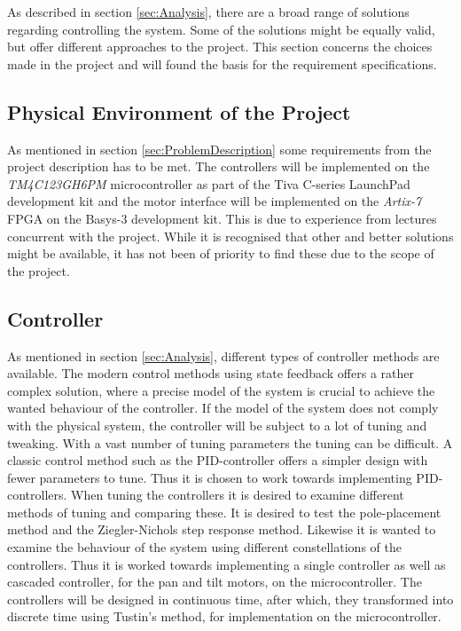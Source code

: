 \documentclass[../../main.tex]{subfiles}
\begin{document}
As described in section \ref{sec:Analysis}, there are a broad range of solutions regarding controlling the system. Some of the solutions might be equally valid, but offer different approaches to the project. This section concerns the choices made in the project and will found the basis for the requirement specifications.

\subsection*{Physical Environment of the Project}
As mentioned in section \ref{sec:ProblemDescription} some requirements from the project description has to be met. The controllers will be implemented on the \textit{TM4C123GH6PM} microcontroller as part of the Tiva C-series LaunchPad development kit and the motor interface will be implemented on the \textit{Artix-7} FPGA on the Basys-3 development kit. This is due to experience from lectures concurrent with the project. While it is recognised that other and better solutions might be available, it has not been of priority to find these due to the scope of the project. 



\subsection*{Controller}
As mentioned in section \ref{sec:Analysis}, different types of controller methods are available. The modern control methods using state feedback offers a rather complex solution, where a precise model of the system is crucial to achieve the wanted behaviour of the controller. If the model of the system does not comply with the physical system, the controller will be subject to a lot of tuning and tweaking. With a vast number of tuning parameters the tuning can be difficult. A classic control method such as the PID-controller offers a simpler design with fewer parameters to tune. Thus it is chosen to work towards implementing PID-controllers. When tuning the controllers it is desired to examine different methods of tuning and comparing these. It is desired to test the pole-placement method and the Ziegler-Nichols step response method. Likewise it is wanted to examine the behaviour of the system using different constellations of the controllers. Thus it is worked towards implementing a single controller as well as cascaded controller, for the pan and tilt motors, on the microcontroller. 
The controllers will be designed in continuous time, after which, they transformed into discrete time using Tustin's method, for implementation on the microcontroller. 
\end{document}
